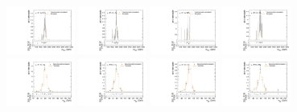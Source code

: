 \begin{figure}[htpb]
  \includegraphics[width=0.2\textwidth]{fig/2Dfit/templateVsReco_ZprToWW2000_r0_MVV_mu_HP_vbf_LDy_linear.pdf}
  \includegraphics[width=0.2\textwidth]{fig/2Dfit/templateVsReco_ZprToWW2000_r0_MVV_mu_LP_vbf_LDy_linear.pdf}
  \includegraphics[width=0.2\textwidth]{fig/2Dfit/templateVsReco_ZprToWW2000_r0_MVV_mu_HP_vbf_HDy_linear.pdf}
  \includegraphics[width=0.2\textwidth]{fig/2Dfit/templateVsReco_ZprToWW2000_r0_MVV_mu_LP_vbf_HDy_linear.pdf}\\
  \includegraphics[width=0.2\textwidth]{fig/2Dfit/templateVsReco_ZprToWW2000_r0_MJ_mu_HP_bb_LDy.pdf}
  \includegraphics[width=0.2\textwidth]{fig/2Dfit/templateVsReco_ZprToWW2000_r0_MJ_mu_LP_bb_LDy.pdf}
  \includegraphics[width=0.2\textwidth]{fig/2Dfit/templateVsReco_ZprToWW2000_r0_MJ_mu_HP_bb_HDy.pdf}
  \includegraphics[width=0.2\textwidth]{fig/2Dfit/templateVsReco_ZprToWW2000_r0_MJ_mu_LP_bb_HDy.pdf}\\

\end{figure}
